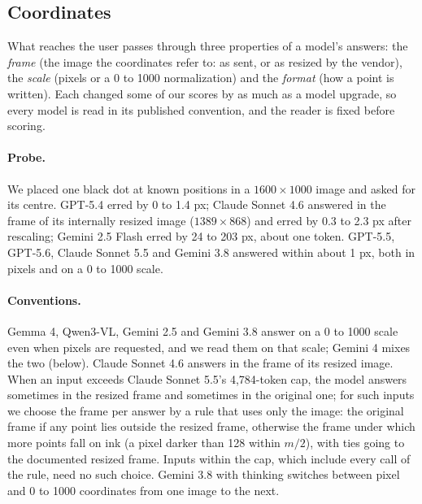 \subsection{Coordinates}
\label{sec:coords}

What reaches the user passes through three properties of a model's answers: the \emph{frame} (the image the coordinates refer to: as sent, or as resized by the vendor), the \emph{scale} (pixels or a 0 to 1000 normalization) and the \emph{format} (how a point is written). Each changed some of our scores by as much as a model upgrade, so every model is read in its published convention, and the reader is fixed before scoring.

\paragraph{Probe.} We placed one black dot at known positions in a $1600 \times 1000$ image and asked for its centre. GPT-5.4 erred by 0 to 1.4 px; Claude Sonnet 4.6 answered in the frame of its internally resized image ($1389 \times 868$) and erred by 0.3 to 2.3 px after rescaling; Gemini 2.5 Flash erred by 24 to 203 px, about one token. GPT-5.5, GPT-5.6, Claude Sonnet 5.5 and Gemini 3.8 answered within about 1 px, both in pixels and on a 0 to 1000 scale.

\paragraph{Conventions.} Gemma 4, Qwen3-VL, Gemini 2.5 and Gemini 3.8 answer on a 0 to 1000 scale even when pixels are requested, and we read them on that scale; Gemini 4 mixes the two (below). Claude Sonnet 4.6 answers in the frame of its resized image. When an input exceeds Claude Sonnet 5.5's 4{,}784-token cap, the model answers sometimes in the resized frame and sometimes in the original one; for such inputs we choose the frame per answer by a rule that uses only the image: the original frame if any point lies outside the resized frame, otherwise the frame under which more points fall on ink (a pixel darker than 128 within $m/2$), with ties going to the documented resized frame. Inputs within the cap, which include every call of the rule, need no such choice. Gemini 3.8 with thinking switches between pixel and 0 to 1000 coordinates from one image to the next.

